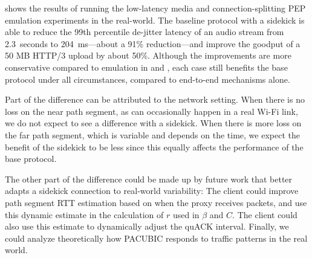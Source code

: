  shows the results of running the low-latency media and
connection-splitting PEP emulation experiments in the real-world. The baseline
protocol with a sidekick is able to
reduce the 99th percentile de-jitter latency of an audio stream
from 2.3~seconds to 204~ms---about a 91\% reduction---and
improve the goodput of a 50 MB HTTP/3 upload by about 50\%.
Although the improvements are more conservative compared to emulation in
 and , each case still benefits the
base protocol under all circumstances, compared to end-to-end mechanisms alone.

Part of the difference can be attributed to the network setting. When there is
no loss on the near path segment, as can occasionally happen in a real Wi-Fi link,
we do not expect to
see a difference with a sidekick. When there is more loss on the far path segment, which
is variable and depends on the time, we
expect the benefit of the sidekick to be less since this equally affects the
performance of the base protocol.

The other part of the difference could be made up by future work that better
adapts a sidekick connection to real-world variability: The client could improve
path segment RTT estimation based on when the proxy receives packets, and use this
dynamic estimate in the calculation of $r$ used in $\beta$ and $C$.
The client could also use
this estimate to dynamically adjust the quACK interval.
Finally, we could analyze theoretically how PACUBIC responds
to traffic patterns in the real world.
